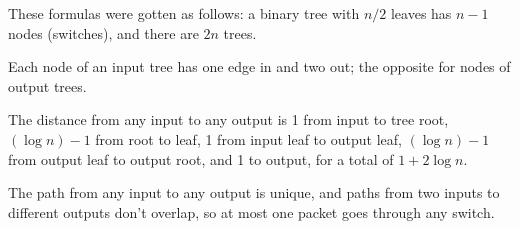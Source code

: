 \documentclass[12pt,twoside]{article}
\begin{document}
\begin{problem}
\begin{solution}

These formulas were gotten as follows: a binary tree with $n/2$ leaves has
$n-1$ nodes (switches), and there are $2n$ trees.

Each node of an input tree has one edge in and two out; the opposite
for nodes of output trees.

The distance from any input to any output is 1 from input to tree root,
$(\log n)-1$ from root to leaf, 1 from input leaf to output leaf, $(\log
n)-1$ from output leaf to output root, and 1 to output, for a total of $1+
2\log n$.

The path from any input to any output is unique, and paths from two inputs
to different outputs don't overlap, so at most one packet goes through any
switch.
\end{solution}

\eparts

\end{problem}
\end{document}
